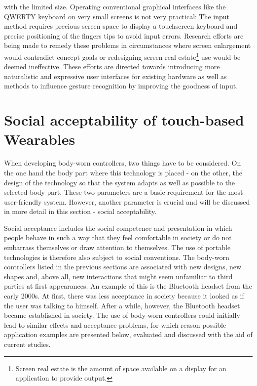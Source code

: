 \documentclass{sigchi}
\begin{document}
with the limited size. Operating conventional graphical interfaces like the QWERTY keyboard on very small screens is not very practical: The input method requires precious screen space to display a touchscreen keyboard and precise positioning of the fingers tips to avoid input errors. \cite{vogel7} Research efforts are being made to remedy these problems in circumstances where screen enlargement would contradict concept goals or redesigning screen real estate\footnote{Screen real estate is the amount of space available on a display for an application to provide output. } %
use would  be deemed ineffective. These efforts are directed towards introducing more naturalistic and expressive user interfaces for existing hardware as well as methods to influence gesture recognition by improving the goodness of input. \cite{motion-ui, vogel7} %



\section{Social acceptability of touch-based Wearables}
When developing body-worn controllers, two things have to be considered. On the one hand the body part where this technology is placed - on the other, the design of the technology so that the system adapts as well as possible to the selected body part. These two parameters are a basic requirement for the most user-friendly system. \cite{touch-wrist} However, another parameter is crucial and will be discussed in more detail in this section - social acceptability.

Social acceptance includes the social competence and presentation in which people behave in such a way that they feel comfortable in society or do not embarrass themselves or draw attention to themselves. \cite{self-everyday} The use of portable technologies is therefore also subject to social conventions. The body-worn controllers listed in the previous sections are associated with new designs, new shapes and, above all, new interactions that might seem unfamiliar to third parties at first appearances.
An example of this is the Bluetooth headset from the early 2000s. At first, there was less acceptance in society because it looked as if the user was talking to himself. After a while, however, the Bluetooth headset became established in society. \cite{usable-gesture} The use of body-worn controllers could initially lead to similar effects and acceptance problems, for which reason possible application examples are presented below, evaluated and discussed with the aid of current studies.
\end{document}
